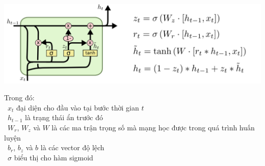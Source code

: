 \begin{minipage}{0.5\textwidth}
\centering
\includegraphics[width=1\textwidth]{resources/chapter-4/gru-1.png}
\end{minipage}

Trong đó:\\
    \indent\textbullet\ \(x_t\) đại diện cho đầu vào tại bước thời gian \(t\)\\
    \indent\textbullet\ \(h_{t-1}\)  là trạng thái ẩn trước đó \\
    \indent\textbullet\ \(W_r\), \(W_z\) và \(W\) là các ma trận trọng số mà mạng học được trong quá trình huấn luyện\\
    \indent\textbullet\ \(b_r\), \(b_z\) và \(b\) là các vector độ lệch\\
    \indent\textbullet\ \(\sigma\) biểu thị cho hàm sigmoid
    

